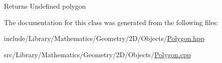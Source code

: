 \begin{DoxyReturn}{Returns}
Undefined polygon 
\end{DoxyReturn}


The documentation for this class was generated from the following files\+:\begin{DoxyCompactItemize}
\item 
include/\+Library/\+Mathematics/\+Geometry/2\+D/\+Objects/\hyperlink{2_d_2_objects_2_polygon_8hpp}{Polygon.\+hpp}\item 
src/\+Library/\+Mathematics/\+Geometry/2\+D/\+Objects/\hyperlink{2_d_2_objects_2_polygon_8cpp}{Polygon.\+cpp}\end{DoxyCompactItemize}
